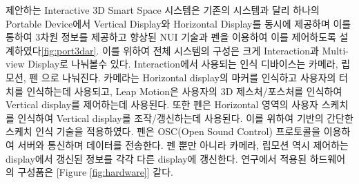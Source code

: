 제안하는 Interactive 3D Smart Space 시스템은 기존의 시스템과 달리 하나의 Portable Device에서 Vertical Display와 Horizontal Display를 동시에 제공하며 이를 통하여 3차원 정보를 제공하고 향상된 NUI 기술과 펜을 이용하여 이를 제어하도록 설계하였다\ref{fig:port3dar}. 이를 위하여 전체 시스템의 구성은 크게 Interaction과 Multi-view Display로 나눠볼수 있다. Interaction에서 사용되는 인식 디바이스는 카메라, 립모션, 펜 으로 나눠진다. 카메라는 Horizontal display의 마커를 인식하고 사용자의 터치를 인식하는데 사용되고, Leap Motion은 사용자의 3D 제스처/포스처를 인식하여 Vertical display를 제어하는데 사용된다. 또한 펜은 Horizontal 영역의 사용자 스케치를 인식하여 Vertical display를 조작/갱신하는데 사용된다. 이를 위하여 \cite{wobbrock_gestures_2007} 기반의 간단한 스케치 인식 기술을 적용하였다. 펜은 OSC(Open Sound Control) 프로토콜\cite {wright_open_1997}을 이용하여 서버와 통신하며 데이터를 전송한다. 펜 뿐만 아니라 카메라, 립모션 역시 제어하는 display에서 갱신된 정보를 각각 다른 display에 갱신한다. 연구에서 적용된 하드웨어의 구성품은  [Figure \ref {fig:hardware}] 같다.

